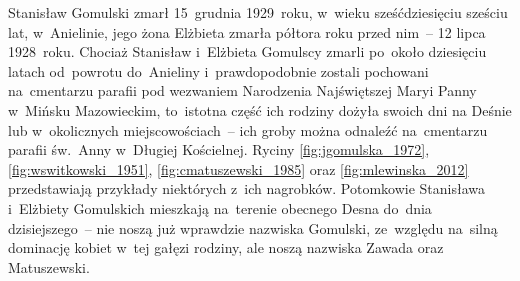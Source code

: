 \begin{figure}[!ht]
\end{figure}

Stanisław Gomulski zmarł
15~grudnia 1929~roku, w~wieku sześćdziesięciu sześciu lat, w~Anielinie,
jego żona Elżbieta
zmarła półtora roku przed nim~-- 12 lipca 1928~roku. Chociaż Stanisław
i~Elżbieta Gomulscy zmarli po~około dziesięciu latach od~powrotu do~Anieliny
i~prawdopodobnie zostali pochowani na~cmentarzu parafii pod wezwaniem
Narodzenia Najświętszej Maryi Panny w~Mińsku Mazowieckim, to~istotna część ich
rodziny dożyła swoich dni na Deśnie lub w~okolicznych miejscowościach~-- ich
groby można odnaleźć na~cmentarzu parafii św.~Anny w~Długiej Kościelnej.
Ryciny \ref{fig:jgomulska_1972}, \ref{fig:wswitkowski_1951},
\ref{fig:cmatuszewski_1985} oraz \ref{fig:mlewinska_2012} przedstawiają
przykłady niektórych z~ich nagrobków. Potomkowie Stanisława i~Elżbiety
Gomulskich mieszkają na~terenie obecnego Desna do~dnia dzisiejszego~-- nie
noszą już wprawdzie nazwiska Gomulski, ze~względu na~silną dominację kobiet
w~tej gałęzi rodziny, ale noszą nazwiska Zawada oraz Matuszewski.


